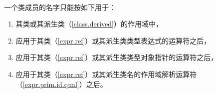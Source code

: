 \paragraph{} %
一个类成员的名字只能按如下用于：
\begin{enumerate}
  \item 其类或其派生类（\ref{class.derived}）的作用域中，
  \item 应用于其类（\ref{expr.ref}）或其派生类类型表达式的运算符之后，
  \item 应用于其类（\ref{expr.ref}）或其派生类类型对象指针的\tm{->}运算符之后，
  \item 应用于其类（\ref{expr.ref}）或其派生类名的\tm{::}作用域解析运算符
        （\ref{expr.prim.id.qual}）之后。
\end{enumerate}

